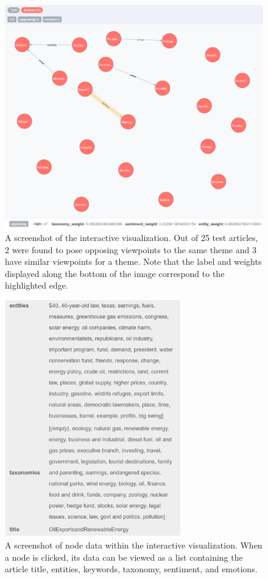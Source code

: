 \documentclass[12pt]{article}
\begin{document}
\begin{figure}[here]
\includegraphics[width=6.5in]{graph_screenshot}
\caption{A screenshot of the interactive visualization. Out of 25 test articles, 2 were found to pose opposing viewpoints to the same theme and 3 have similar viewpoints for a theme. Note that the label and weights displayed along the bottom of the image correspond to the highlighted edge.}
\label{fig:graph}
\end{figure}

\begin{figure}[here]
\includegraphics[width=3in]{graph_node_screenshot}
\caption{A screenshot of node data within the interactive visualization. When a node is clicked, its data can be viewed as a list containing the article title, entities, keywords, taxonomy, sentiment, and emotions.}
\label{fig:graphNode}
\end{figure}
\end{document}
